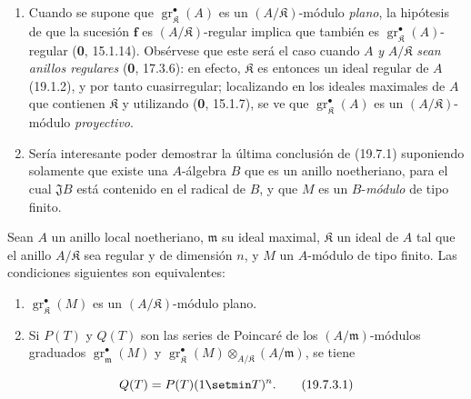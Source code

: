 \begin{remarks}[19.7.2]
\label{IV.19.7.2}
\begin{enumerate}
  \item[(i)] Cuando se supone que $\operatorname{gr}_{\mathfrak K}^\bullet(A)$ es un $(A/\mathfrak K)$-módulo \emph{plano}, la hipótesis de que la sucesión $\mathbf f$ es $(A/\mathfrak K)$-regular implica que también es $\operatorname{gr}_{\mathfrak K}^\bullet(A)$-regular (\textbf{0}, 15.1.14). Obsérvese que este será el caso cuando $A$ \emph{y} $A/\mathfrak K$ \emph{sean anillos regulares} (\textbf{0}, 17.3.6): en efecto, $\mathfrak K$ es entonces un ideal regular de $A$ (19.1.2), y por tanto cuasirregular; localizando en los ideales maximales de $A$ que contienen $\mathfrak K$ y utilizando (\textbf{0}, 15.1.7), se ve que $\operatorname{gr}_{\mathfrak K}^\bullet(A)$ es un $(A/\mathfrak K)$-módulo \emph{proyectivo}.
  \item[(ii)] Sería interesante poder demostrar la última conclusión de (19.7.1) suponiendo solamente que existe una $A$-álgebra $B$ que es un anillo noetheriano, para el cual $\mathfrak JB$ está contenido en el radical de $B$, y que $M$ es un $B$-\emph{módulo} de tipo finito.
\end{enumerate}
\end{remarks}

\begin{corollary}[19.7.3]
\label{IV.19.7.3}
Sean $A$ un anillo local noetheriano, $\mathfrak m$ su ideal maximal, $\mathfrak K$ un ideal de $A$ tal que el anillo $A/\mathfrak K$ sea regular y de dimensión $n$, y $M$ un $A$-módulo de tipo finito. Las condiciones siguientes son equivalentes:
\begin{enumerate}
  \item[\textup{a)}] $\operatorname{gr}_{\mathfrak K}^\bullet(M)$ es un $(A/\mathfrak K)$-módulo plano.
  \item[\textup{b)}] Si $P(T)$ y $Q(T)$ son las series de Poincaré de los $(A/\mathfrak m)$-módulos graduados $\operatorname{gr}_{\mathfrak m}^\bullet(M)$ y $\operatorname{gr}_{\mathfrak K}^\bullet(M)\otimes_{A/\mathfrak K}(A/\mathfrak m)$, se tiene
\end{enumerate}
\begin{equation}
  Q(T)=P(T)(1\setmin T)^n.
  \tag{19.7.3.1}\label{IV.19.7.3.1}
\end{equation}
\end{corollary}

